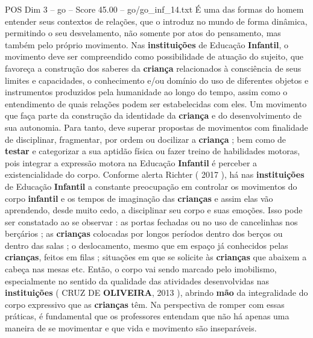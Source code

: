\begin{textsample}{POS Dim 3 – go – Score 45.00 – go/go\_inf\_14.txt}
É uma das formas do homem entender seus contextos de relações, que o introduz no mundo de forma dinâmica, permitindo o seu desvelamento, não somente por atos do pensamento, mas também pelo próprio movimento.
Nas \textbf{instituições} de Educação \textbf{Infantil}, o movimento deve ser compreendido como possibilidade de atuação do sujeito, que favoreça a construção dos saberes da \textbf{criança} relacionados à consciência de seus limites e capacidades, o conhecimento e/ou domínio do uso de diferentes objetos e instrumentos produzidos pela humanidade ao longo do tempo, assim como o entendimento de quais relações podem ser estabelecidas com eles.
Um movimento que faça parte da construção da identidade da \textbf{criança} e do desenvolvimento de sua autonomia.
Para tanto, deve superar propostas de movimentos com finalidade de disciplinar, fragmentar, por ordem ou docilizar a \textbf{criança} ; bem como de \textbf{testar} e categorizar a sua aptidão física ou fazer treino de habilidades motoras, pois integrar a expressão motora na Educação \textbf{Infantil} é perceber a existencialidade do corpo.
Conforme alerta Richter ( 2017 ), há nas \textbf{instituições} de Educação \textbf{Infantil} a constante preocupação em controlar os movimentos do corpo \textbf{infantil} e os tempos de imaginação das \textbf{crianças} e assim elas vão aprendendo, desde muito cedo, a disciplinar seu corpo e suas emoções.
Isso pode ser constatado ao se observar : as portas fechadas ou no uso de cancelinhas nos berçários ; as \textbf{crianças} colocadas por longos períodos dentro dos berços ou dentro das salas ; o deslocamento, mesmo que em espaço já conhecidos pelas \textbf{crianças}, feitos em filas ; situações em que se solicite às \textbf{crianças} que abaixem a cabeça nas mesas etc.
Então, o corpo vai sendo marcado pelo imobilismo, especialmente no sentido da qualidade das atividades desenvolvidas nas \textbf{instituições} ( CRUZ DE \textbf{OLIVEIRA}, 2013 ), abrindo \textbf{mão} da integralidade do corpo expressivo que as \textbf{crianças} têm.
Na perspectiva de romper com essas práticas, é fundamental que os professores entendam que não há apenas uma maneira de se movimentar e que vida e movimento são inseparáveis.

\end{textsample}
